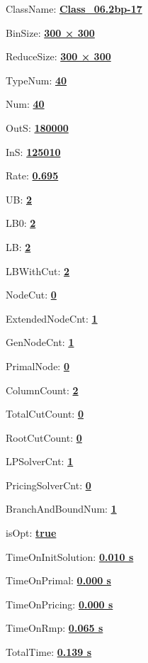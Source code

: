 \documentclass[11pt]{article}
\begin{document}
\pagestyle{empty}


ClassName: \underline{\textbf{Class_06.2bp-17}}
\par
BinSize: \underline{\textbf{300 × 300}}
\par
ReduceSize: \underline{\textbf{300 × 300}}
\par
TypeNum: \underline{\textbf{40}}
\par
Num: \underline{\textbf{40}}
\par
OutS: \underline{\textbf{180000}}
\par
InS: \underline{\textbf{125010}}
\par
Rate: \underline{\textbf{0.695}}
\par
UB: \underline{\textbf{2}}
\par
LB0: \underline{\textbf{2}}
\par
LB: \underline{\textbf{2}}
\par
LBWithCut: \underline{\textbf{2}}
\par
NodeCut: \underline{\textbf{0}}
\par
ExtendedNodeCnt: \underline{\textbf{1}}
\par
GenNodeCnt: \underline{\textbf{1}}
\par
PrimalNode: \underline{\textbf{0}}
\par
ColumnCount: \underline{\textbf{2}}
\par
TotalCutCount: \underline{\textbf{0}}
\par
RootCutCount: \underline{\textbf{0}}
\par
LPSolverCnt: \underline{\textbf{1}}
\par
PricingSolverCnt: \underline{\textbf{0}}
\par
BranchAndBoundNum: \underline{\textbf{1}}
\par
isOpt: \underline{\textbf{true}}
\par
TimeOnInitSolution: \underline{\textbf{0.010 s}}
\par
TimeOnPrimal: \underline{\textbf{0.000 s}}
\par
TimeOnPricing: \underline{\textbf{0.000 s}}
\par
TimeOnRmp: \underline{\textbf{0.065 s}}
\par
TotalTime: \underline{\textbf{0.139 s}}
\par
\newpage
\end{document}
